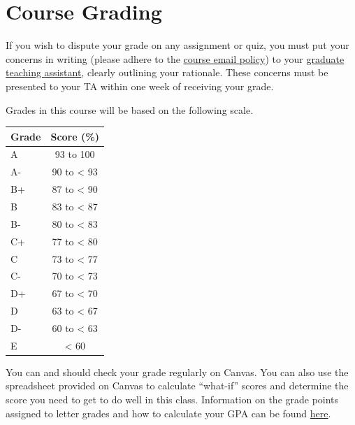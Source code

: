 \documentclass[
  letterpaper,
]{article}
\begin{document}
\section{Course Grading}\label{course-grading}

\begin{tcolorbox}[enhanced jigsaw, breakable, coltitle=black, opacityback=0, rightrule=.15mm, colframe=quarto-callout-important-color-frame, bottomtitle=1mm, opacitybacktitle=0.6, bottomrule=.15mm, left=2mm, toptitle=1mm, titlerule=0mm, title=\textcolor{quarto-callout-important-color}{\faExclamation}\hspace{0.5em}{Important}, colback=white, arc=.35mm, toprule=.15mm, leftrule=.75mm, colbacktitle=quarto-callout-important-color!10!white]

If you wish to dispute your grade on any assignment or quiz, you must
put your concerns in writing (please adhere to the
\hyperref[sec-policies]{course email policy}) to your
\hyperref[sec-ta]{graduate teaching assistant}, clearly outlining your
rationale. These concerns must be presented to your TA within one week
of receiving your grade.

\end{tcolorbox}

Grades in this course will be based on the following scale.

\begin{longtable}[]{@{}lc@{}}
\toprule\noalign{}
Grade & Score (\%) \\
\midrule\noalign{}
\endhead
\bottomrule\noalign{}
\endlastfoot
A & 93 to 100 \\
A- & 90 to \textless{} 93 \\
B+ & 87 to \textless{} 90 \\
B & 83 to \textless{} 87 \\
B- & 80 to \textless{} 83 \\
C+ & 77 to \textless{} 80 \\
C & 73 to \textless{} 77 \\
C- & 70 to \textless{} 73 \\
D+ & 67 to \textless{} 70 \\
D & 63 to \textless{} 67 \\
D- & 60 to \textless{} 63 \\
E & \textless{} 60 \\
\end{longtable}

You can and should check your grade regularly on Canvas. You can also
use the spreadsheet provided on Canvas to calculate ``what-if'' scores
and determine the score you need to get to do well in this class.
Information on the grade points assigned to letter grades and how to
calculate your GPA can be found
\href{https://advising.utah.edu/academic-standards/gpa-calculator-new.php}{here}.
\end{document}
